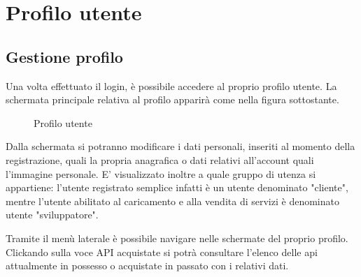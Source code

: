 \newpage
\section{Profilo utente}

\subsection{Gestione profilo}

Una volta effettuato il login, è possibile accedere al proprio profilo utente. La schermata principale relativa al profilo apparirà come nella figura sottostante.

\label{Profilo utente}
\begin{figure}[H]
	\centering
	\caption{Profilo utente}
\end{figure}

Dalla schermata si potranno modificare i dati personali, inseriti al momento della registrazione, quali la propria anagrafica o dati relativi all'account quali l'immagine personale. E' visualizzato inoltre a quale gruppo di utenza si appartiene: l'utente registrato semplice infatti è un utente denominato "cliente", mentre l'utente abilitato al caricamento e alla vendita di servizi è denominato utente "sviluppatore".

Tramite il menù laterale è possibile navigare nelle schermate del proprio profilo. Clickando sulla voce API acquistate si potrà consultare l'elenco delle api attualmente in possesso o acquistate in passato con i relativi dati. 

